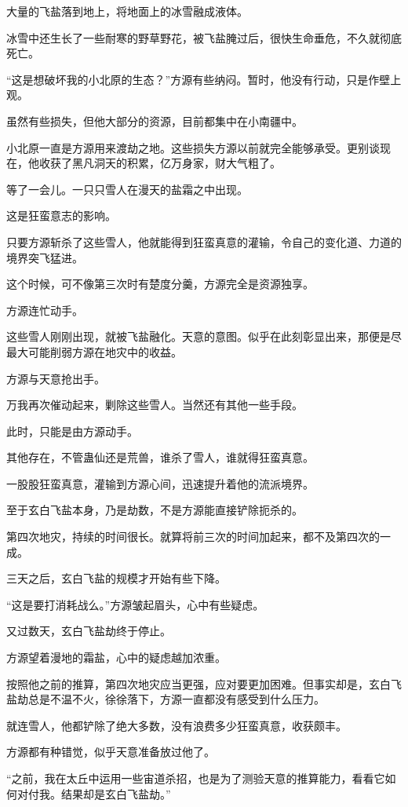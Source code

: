 \begin{this_body}
大量的飞盐落到地上，将地面上的冰雪融成液体。

冰雪中还生长了一些耐寒的野草野花，被飞盐腌过后，很快生命垂危，不久就彻底死亡。

“这是想破坏我的小北原的生态？”方源有些纳闷。暂时，他没有行动，只是作壁上观。

虽然有些损失，但他大部分的资源，目前都集中在小南疆中。

小北原一直是方源用来渡劫之地。这些损失方源以前就完全能够承受。更别谈现在，他收获了黑凡洞天的积累，亿万身家，财大气粗了。

等了一会儿。一只只雪人在漫天的盐霜之中出现。

这是狂蛮意志的影响。

只要方源斩杀了这些雪人，他就能得到狂蛮真意的灌输，令自己的变化道、力道的境界突飞猛进。

这个时候，可不像第三次时有楚度分羹，方源完全是资源独享。

方源连忙动手。

这些雪人刚刚出现，就被飞盐融化。天意的意图。似乎在此刻彰显出来，那便是尽最大可能削弱方源在地灾中的收益。

方源与天意抢出手。

万我再次催动起来，剿除这些雪人。当然还有其他一些手段。

此时，只能是由方源动手。

其他存在，不管蛊仙还是荒兽，谁杀了雪人，谁就得狂蛮真意。

一股股狂蛮真意，灌输到方源心间，迅速提升着他的流派境界。

至于玄白飞盐本身，乃是劫数，不是方源能直接铲除扼杀的。

第四次地灾，持续的时间很长。就算将前三次的时间加起来，都不及第四次的一成。

三天之后，玄白飞盐的规模才开始有些下降。

“这是要打消耗战么。”方源皱起眉头，心中有些疑虑。

又过数天，玄白飞盐劫终于停止。

方源望着漫地的霜盐，心中的疑虑越加浓重。

按照他之前的推算，第四次地灾应当更强，应对要更加困难。但事实却是，玄白飞盐劫总是不温不火，徐徐落下，方源一直都没有感受到什么压力。

就连雪人，他都铲除了绝大多数，没有浪费多少狂蛮真意，收获颇丰。

方源都有种错觉，似乎天意准备放过他了。

“之前，我在太丘中运用一些宙道杀招，也是为了测验天意的推算能力，看看它如何对付我。结果却是玄白飞盐劫。”


\end{this_body}
